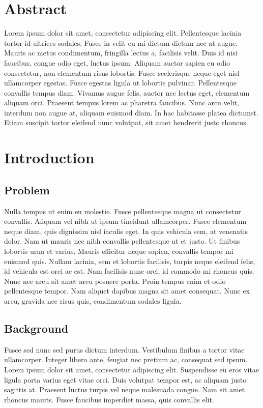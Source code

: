



\chapter{Abstract}
Lorem ipsum dolor sit amet, consectetur adipiscing elit. Pellentesque lacinia tortor id ultrices sodales. Fusce in velit eu mi dictum dictum nec at augue. Mauris ac metus condimentum, fringilla lectus a, facilisis velit. Duis id nisi faucibus, congue odio eget, luctus ipsum. Aliquam auctor sapien eu odio consectetur, non elementum risus lobortis. Fusce scelerisque neque eget nisl ullamcorper egestas. Fusce egestas ligula ut lobortis pulvinar. Pellentesque convallis tempus diam. Vivamus augue felis, auctor nec lectus eget, elementum aliquam orci. Praesent tempus lorem ac pharetra faucibus. Nunc arcu velit, interdum non augue at, aliquam euismod diam. In hac habitasse platea dictumst. Etiam suscipit tortor eleifend nunc volutpat, sit amet hendrerit justo rhoncus.


\chapter{Introduction}


\section{Problem} 
Nulla tempus ut enim eu molestie. Fusce pellentesque magna ut consectetur convallis. Aliquam vel nibh ut ipsum tincidunt ullamcorper. Fusce elementum neque diam, quis dignissim nisl iaculis eget. In quis vehicula sem, at venenatis dolor. Nam ut mauris nec nibh convallis pellentesque ut et justo. Ut finibus lobortis urna et varius. Mauris efficitur neque sapien, convallis tempor mi euismod quis. Nullam lacinia, sem et lobortis facilisis, turpis neque eleifend felis, id vehicula est orci ac est. Nam facilisis nunc orci, id commodo mi rhoncus quis. Nunc nec arcu sit amet arcu posuere porta. Proin tempus enim et odio pellentesque tempor. Nam aliquet dapibus magna sit amet consequat. Nunc ex arcu, gravida nec risus quis, condimentum sodales ligula.

\section{Background}
Fusce sed nunc sed purus dictum interdum. Vestibulum finibus a tortor vitae ullamcorper. Integer libero ante, feugiat nec pretium ac, consequat sed ipsum. Lorem ipsum dolor sit amet, consectetur adipiscing elit. Suspendisse eu eros vitae ligula porta varius eget vitae orci. Duis volutpat tempor est, ac aliquam justo sagittis at. Praesent luctus turpis vel neque malesuada congue. Nam sit amet rhoncus mauris. Fusce faucibus imperdiet massa, quis convallis elit.

